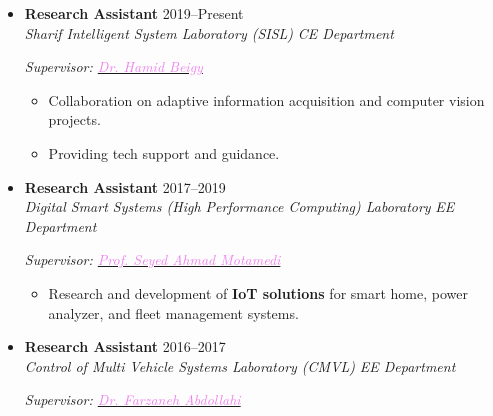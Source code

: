 \documentclass[11pt,a4paper,roman]{moderncv} %
\newcommand*{\authorimg}[1]{%
	\raisebox{-.3\baselineskip}{%
		\texttt{[image: \#1]}%
	}%
}
\begin{document}
\begin{itemize}
	\item \textbf{Research Assistant} \hfill 2019--Present \\
	\authorimg{pictures/sut.png} \emph{Sharif Intelligent System Laboratory (SISL)} \hfill \emph{CE Department}
	
	\begin{adjustwidth}{0.2in}{0in}
		\emph{Supervisor: \href{http://sharif.edu/~beigy}{\textcolor{violet}{Dr. Hamid Beigy}}}
		
		\begin{itemize}
			\item Collaboration on adaptive information acquisition and computer vision projects.
			\item Providing tech support and guidance.
		\end{itemize}
	\end{adjustwidth}
	
	\vspace{10pt}
	
	\item \textbf{Research Assistant} \hfill 2017--2019 \\
	\authorimg{pictures/aut.png} \emph{Digital Smart Systems (High Performance Computing) Laboratory} \hfill \emph{EE Department}
	
	\begin{adjustwidth}{0.2in}{0in}
		\emph{Supervisor: \href{http://ele.aut.ac.ir/~motamedi}{\textcolor{violet}{Prof. Seyed Ahmad Motamedi}}}
		
		\begin{itemize}
			\item Research and development of \textbf{IoT solutions} for smart home, power analyzer, and fleet management systems.
		\end{itemize}
	\end{adjustwidth}

	\vspace{10pt}

	\item \textbf{Research Assistant} \hfill 2016--2017 \\
	\authorimg{pictures/aut.png} \emph{Control of Multi Vehicle Systems Laboratory (CMVL)} \hfill \emph{EE Department}
	
	\begin{adjustwidth}{0.2in}{0in}
		\emph{Supervisor: \href{http://ele.aut.ac.ir/~abdollahi}{\textcolor{violet}{Dr. Farzaneh Abdollahi}}}
		

\end{adjustwidth}
\end{itemize}
\end{document}

